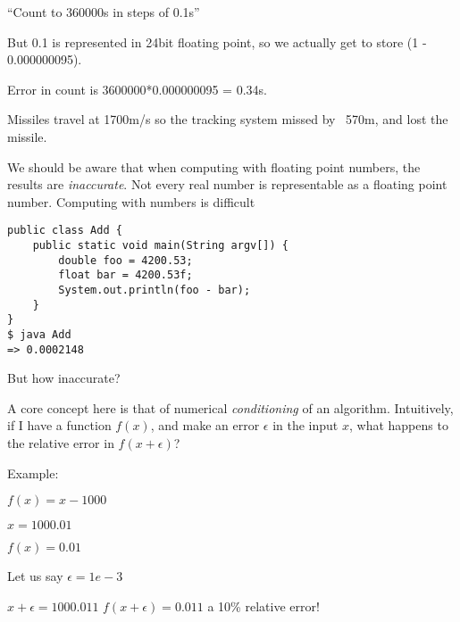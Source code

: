\documentclass[presentation]{beamer}
\begin{document}
\begin{frame}[fragile]
  ``Count to 360000s in steps of 0.1s''

  But 0.1 is represented in 24bit floating point, so we actually get
  to store (1 - 0.000000095).

  Error in count is 3600000*0.000000095 = 0.34s.

  Missiles travel at 1700m/s so the tracking system missed by ~570m,
  and lost the missile.

  We should be aware that when computing with floating point numbers,
  the results are \emph{inaccurate}.  Not every real number is
  representable as a floating point number.
Computing with numbers is difficult

\begin{verbatim}
public class Add {
    public static void main(String argv[]) {
        double foo = 4200.53;
        float bar = 4200.53f;
        System.out.println(foo - bar);
    }
}
$ java Add
=> 0.0002148
\end{verbatim}


  But how inaccurate?

  A core concept here is that of numerical \emph{conditioning} of an
  algorithm.  Intuitively, if I have a function $f(x)$, and make an
  error $\epsilon$ in the input $x$, what happens to the relative
  error in $f(x+\epsilon)$?

  Example:

  $f(x) = x - 1000$

  $x = 1000.01$

  $f(x) = 0.01$

  Let us say $\epsilon = 1e-3$

  $x + \epsilon = 1000.011$
  $f(x + \epsilon) = 0.011$ a 10\% relative error!

\end{frame}
\end{document}
